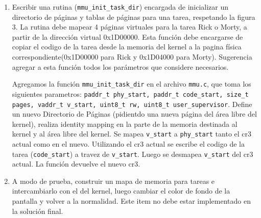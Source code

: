 \documentclass[a4paper]{article}
\begin{document}
\begin{enumerate}[label=\alph*)]
\begin{enumerate}[label=\Roman{*}-]
 	\end{enumerate}
 	
 	\item Escribir una rutina (\texttt{mmu\_init\_task\_dir}) encargada de inicializar un directorio de páginas y tablas de páginas para una tarea, respetando la figura 3. La rutina debe mapear 4 p\'aginas virtuales para la tarea Rick o Morty, a partir de la dirección virtual 0x1D00000. Esta función debe encargarse de copiar el codigo de la tarea desde la memoria del kernel a la pagina física correspondiente(0x1D00000 para Rick y 0x1D04000 para Morty). Sugerencia agregar a esta función todos los parámetros que considere necesarios.
 	
 	Agregamos la función \texttt{mmu\_init\_task\_dir} en el archivo \texttt{mmu.c}, que toma los siguientes parametros: \texttt{paddr\_t phy\_start, paddr\_t code\_start, size\_t pages, vaddr\_t v\_start, uint8\_t rw, uint8\_t user\_supervisor}. 
	Define un nuevo Directorio de P\'aginas (pidientdo una nueva p\'agina del \'area libre del kernel), realiza identity mapping en la parte de la memoria destinada al kernel y al \'area libre del kernel. Se mapea \texttt{v\_start} a \texttt{phy\_start} tanto el cr3 actual como en el nuevo. Utilizando el cr3 actual  se escribe el codigo de la tarea (\texttt{code\_start}) a travez de \texttt{v\_start}. Luego se desmapea \texttt{v\_start} del cr3 actual. La función devuelve el nuevo cr3.
	
	\item A modo de prueba, construir un mapa de memoria para tareas e intercambiarlo con el del kernel, luego cambiar el color de fondo de la pantalla y volver a la normalidad. Este item no debe estar implementado en la soluci\'on final.
 	
 
 	
 \end{enumerate}
 
\end{document}
